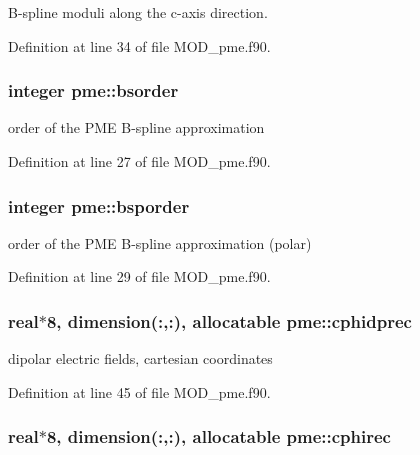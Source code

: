 B-\/spline moduli along the c-\/axis direction. 



Definition at line 34 of file M\-O\-D\-\_\-pme.\-f90.

\hypertarget{classpme_a99388aa40eb079175f21e1661c522736}{
\subsubsection[{bsorder}]{\setlength{\rightskip}{0pt plus 5cm}integer pme\-::bsorder}}\label{classpme_a99388aa40eb079175f21e1661c522736}


order of the P\-M\-E B-\/spline approximation 



Definition at line 27 of file M\-O\-D\-\_\-pme.\-f90.

\hypertarget{classpme_adfaef23ac8fb63bc55ee5618da503a2b}{
\subsubsection[{bsporder}]{\setlength{\rightskip}{0pt plus 5cm}integer pme\-::bsporder}}\label{classpme_adfaef23ac8fb63bc55ee5618da503a2b}


order of the P\-M\-E B-\/spline approximation (polar) 



Definition at line 29 of file M\-O\-D\-\_\-pme.\-f90.

\hypertarget{classpme_a312266776211f48232fff6d6366c1744}{
\subsubsection[{cphidprec}]{\setlength{\rightskip}{0pt plus 5cm}real$\ast$8, dimension(\-:,\-:), allocatable pme\-::cphidprec}}\label{classpme_a312266776211f48232fff6d6366c1744}


dipolar electric fields, cartesian coordinates 



Definition at line 45 of file M\-O\-D\-\_\-pme.\-f90.

\hypertarget{classpme_a670f4635124f83619157e837135deb8c}{
\subsubsection[{cphirec}]{\setlength{\rightskip}{0pt plus 5cm}real$\ast$8, dimension(\-:,\-:), allocatable pme\-::cphirec}}\label{classpme_a670f4635124f83619157e837135deb8c}


